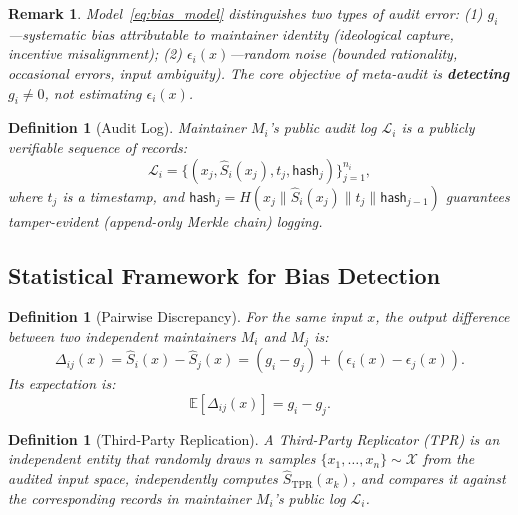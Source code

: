 \documentclass[11pt,a4paper]{article}
\newtheorem{definition}[theorem]{Definition}
\newtheorem{remark}[theorem]{Remark}
\theoremstyle{definition}
\newcommand{\E}{\mathbb{E}}
\begin{document}
\begin{remark}
Model~\eqref{eq:bias_model} distinguishes two types of audit error: (1) $g_i$---systematic bias attributable to maintainer identity (ideological capture, incentive misalignment); (2) $\epsilon_i(x)$---random noise (bounded rationality, occasional errors, input ambiguity). The core objective of meta-audit is \textbf{detecting $g_i \neq 0$}, not estimating $\epsilon_i(x)$.
\end{remark}

\begin{definition}[Audit Log]
\label{def:audit_log}
Maintainer $M_i$'s public audit log $\mathcal{L}_i$ is a publicly verifiable sequence of records:
\begin{equation}\label{eq:audit_log}
    \mathcal{L}_i = \{(x_j, \hat{S}_i(x_j), t_j, \mathsf{hash}_j)\}_{j=1}^{n_i},
\end{equation}
where $t_j$ is a timestamp, and $\mathsf{hash}_j = H(x_j \| \hat{S}_i(x_j) \| t_j \| \mathsf{hash}_{j-1})$ guarantees tamper-evident (append-only Merkle chain) logging.
\end{definition}

\subsection{Statistical Framework for Bias Detection}

\begin{definition}[Pairwise Discrepancy]
\label{def:pairwise_disc}
For the same input $x$, the output difference between two independent maintainers $M_i$ and $M_j$ is:
\begin{equation}\label{eq:pairwise_diff}
    \Delta_{ij}(x) = \hat{S}_i(x) - \hat{S}_j(x) = (g_i - g_j) + (\epsilon_i(x) - \epsilon_j(x)).
\end{equation}
Its expectation is:
\begin{equation}\label{eq:pairwise_expect}
    \E[\Delta_{ij}(x)] = g_i - g_j.
\end{equation}
\end{definition}

\begin{definition}[Third-Party Replication]
\label{def:third_party_rep}
A Third-Party Replicator (TPR) is an independent entity that randomly draws $n$ samples $\{x_1, \ldots, x_n\} \sim \mathcal{X}$ from the audited input space, independently computes $\hat{S}_{\text{TPR}}(x_k)$, and compares it against the corresponding records in maintainer $M_i$'s public log $\mathcal{L}_i$.
\end{definition}
\end{document}

